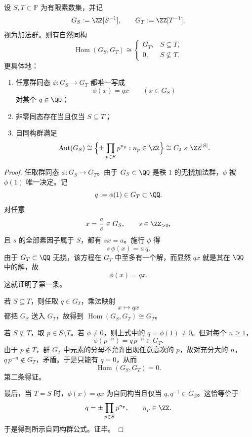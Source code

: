 \begin{conclusion}[局部化数系之间的加法同态具有严格乘法刚性与完全分类]\label{con:xi-time-part62da-localization-hom-rigidity}
设 \(S,T\subset\mathbb P\) 为有限素数集，并记
\[
G_S:=\ZZ[S^{-1}],
\qquad
G_T:=\ZZ[T^{-1}],
\]
视为加法群。则有自然同构
\[
\operatorname{Hom}(G_S,G_T)\cong
\begin{cases}
G_T,& S\subseteq T,\\[1mm]
0,& S\not\subseteq T.
\end{cases}
\]
更具体地：
\begin{enumerate}
  \item 任意群同态 \(\phi:G_S\to G_T\) 都唯一写成
  \[
  \phi(x)=qx
  \qquad(x\in G_S)
  \]
  对某个 \(q\in\QQ\)；
  \item 非零同态存在当且仅当 \(S\subseteq T\)；
  \item 自同构群满足
  \[
  \operatorname{Aut}(G_S)
  \cong
  \Bigl\{\pm\prod_{p\in S}p^{n_p}: n_p\in\ZZ\Bigr\}
  \cong C_2\times \ZZ^{|S|}.
  \]
\end{enumerate}
\end{conclusion}
\begin{proof}
任取群同态 \(\phi:G_S\to G_T\)。由于 \(G_S\subset\QQ\) 是秩 \(1\) 的无挠加法群，\(\phi\) 被 \(\phi(1)\) 唯一决定。记
\[
q:=\phi(1)\in G_T\subset\QQ.
\]
对任意
\[
x=\frac{a}{s}\in G_S,
\qquad
s\in\ZZ_{>0},
\]
且 \(s\) 的全部素因子属于 \(S\)，都有 \(sx=a\)。施行 \(\phi\) 得
\[
s\,\phi(x)=a\,q.
\]
由于 \(G_T\subset\QQ\) 无挠，该方程在 \(G_T\) 中至多有一个解，而显然 \(qx\) 就是其在 \(\QQ\) 中的解，故
\[
\phi(x)=qx.
\]
这就证明了第一条。

若 \(S\subseteq T\)，则任取 \(q\in G_T\)，乘法映射
\[
x\longmapsto qx
\]
都把 \(G_S\) 送入 \(G_T\)，故得到 \(\operatorname{Hom}(G_S,G_T)\cong G_T\)。

若 \(S\not\subseteq T\)，取 \(p\in S\setminus T\)。若 \(\phi\neq 0\)，则上式中的 \(q=\phi(1)\neq 0\)。但对每个 \(n\ge 1\)，
\[
\phi(p^{-n})=q\,p^{-n}\in G_T.
\]
由于 \(p\notin T\)，群 \(G_T\) 中元素的分母不允许出现任意高次的 \(p\)，故对充分大的 \(n\)，\(q\,p^{-n}\notin G_T\)，矛盾。于是只能有 \(q=0\)，从而
\[
\operatorname{Hom}(G_S,G_T)=0.
\]
第二条得证。

最后，当 \(T=S\) 时，\(\phi(x)=qx\) 为自同构当且仅当 \(q,q^{-1}\in G_S\)。这恰等价于
\[
q=\pm\prod_{p\in S}p^{n_p},
\qquad
n_p\in\ZZ.
\]
于是得到所示自同构群公式。证毕。
\end{proof}

